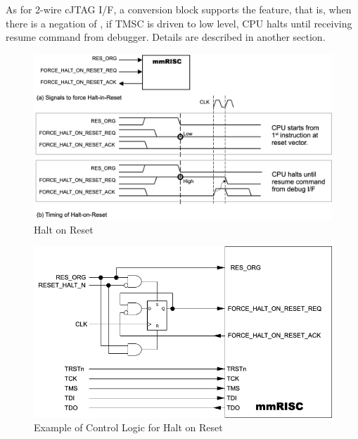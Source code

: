 As for 2-wire cJTAG I/F, a conversion block  supports the feature, that is, when there is a negation of , if TMSC is driven to low level, CPU halts until receiving resume command from debugger. Details are described in another section.\\

\begin{figure}[H]
    \includegraphics[width=1.00\columnwidth]{./Figure/HaltOnReset_IF.png}
    \caption{Halt on Reset}
    \label{fig:HALTONRESET}
\end{figure}

\begin{figure}[H]
    \includegraphics[width=1.00\columnwidth]{./Figure/HaltOnReset_CTRL.png}
    \caption{Example of Control Logic for Halt on Reset}
    \label{fig:HALTONRESETCTRL}
\end{figure}


